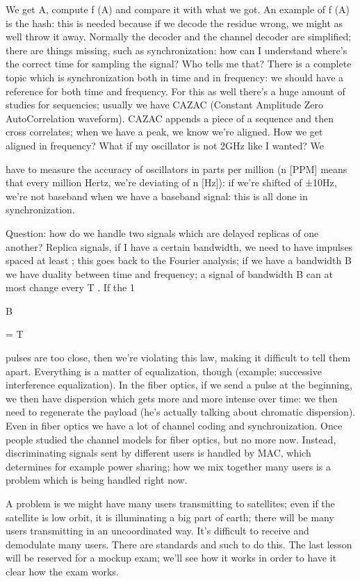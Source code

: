 {{{{{We get A, compute f (A) and compare it with what we got. An example of f (A) is the hash: this is needed because if we decode the residue wrong, we might as well throw it away.
Normally the decoder and the channel decoder are simplified; there are things missing,
such as synchronization: how can I understand where's the correct time for sampling the signal? Who tells me that? There is a complete topic which is synchronization both in time and in frequency: we should have a reference for both time and frequency. For this as well there's a huge amount of studies for sequencies; usually we have CAZAC
(Constant Amplitude Zero AutoCorrelation waveform). CAZAC appends a piece of a sequence and then cross correlates; when we have a peak, we know we're aligned.
How we get aligned in frequency? What if my oscillator is not 2GHz like I wanted? We

have to measure the accuracy of oscillators in parts per million (n [PPM] means that every million Hertz, we're deviating of n [Hz]): if we're shifted of ±10Hz, we're not baseband when we have a baseband signal: this is all done in synchronization.

Question: how do we handle two signals which are delayed replicas of one another?
Replica signals, if I have a certain bandwidth, we need to have impulses spaced at least
; this goes back to the Fourier analysis; if we have a bandwidth B we have duality between time and frequency; a signal of bandwidth B can at most change every T . If the 1

B

= T

pulses are too close, then we're violating this law, making it difficult to tell them apart. Everything is a matter of equalization, though (example: successive interference equalization).
In the fiber optics, if we send a pulse at the beginning, we then have dispersion which gets more and more intense over time: we then need to regenerate the payload (he's actually talking about chromatic dispersion).
Even in fiber optics we have a lot of channel coding and synchronization. Once people studied the channel models for fiber optics, but no more now.
Instead, discriminating signals sent by different users is handled by MAC, which determines for example power sharing; how we mix together many users is a problem which is being handled right now.

A problem is we might have many users transmitting to satellites; even if the satellite is low orbit, it is illuminating a big part of earth; there will be many users transmitting in an uncoordinated way. It's difficult to receive and demodulate many users. There are standards and such to do this.
The last lesson will be reserved for a mockup exam; we'll see how it works in order to have it clear how the exam works.

}}}}}
